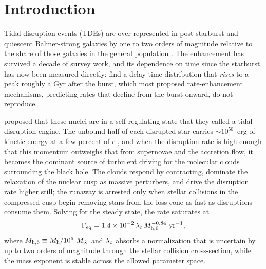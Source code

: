 \documentclass[twocolumn,pdftex]{aastex701}
\newcommand{\msun}{M_{\odot}\xspace}
\newcommand{\mhsix}{M_{\rm h,6}\xspace}
\newcommand{\gameq}{\Gamma_{\rm eq}\xspace}
\newcommand{\lamc}{\lambda_{\rm c}\xspace}
\begin{document}

\section{Introduction}\label{sec:intro}

Tidal disruption events (TDEs) are over-represented in post-starburst and quiescent Balmer-strong galaxies by one to two orders of magnitude relative to the share of those galaxies in the general population \citep{Arcavi:2014a,French:2016a,French:2020a,Hammerstein:2021a,Hammerstein:2023a}. The enhancement has survived a decade of survey work, and its dependence on time since the starburst has now been measured directly: \citet{Shepherd:2026a} find a delay time distribution that {\it rises} to a peak roughly a Gyr after the burst, which most proposed rate-enhancement mechanisms, predicting rates that decline from the burst onward, do not reproduce.

\citet{Guillochon:2026a} proposed that these nuclei are in a self-regulating state that they called a tidal disruption engine. The unbound half of each disrupted star carries $\sim 10^{50}$~erg of kinetic energy at a few percent of $c$ \citep{Guillochon:2016b}, and when the disruption rate is high enough that this momentum outweighs that from supernovae and the accretion flow, it becomes the dominant source of turbulent driving for the molecular clouds surrounding the black hole. The clouds respond by contracting, dominate the relaxation of the nuclear cusp as massive perturbers, and drive the disruption rate higher still; the runaway is arrested only when stellar collisions in the compressed cusp begin removing stars from the loss cone as fast as disruptions consume them. Solving for the steady state, the rate saturates at
\begin{equation}
\gameq = 1.4 \times 10^{-2}\, \lamc\, \mhsix^{-0.84}~{\rm yr}^{-1},
\label{eq:gameq}
\end{equation}
where $\mhsix \equiv M_{\rm h}/10^{6}~\msun$ and $\lamc$ absorbs a normalization that is uncertain by up to two orders of magnitude through the stellar collision cross-section, while the mass exponent is stable across the allowed parameter space.
\end{document}
